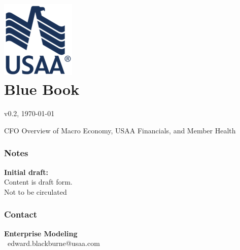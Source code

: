 \documentclass{report}
\begin{document}
\setlength\intextsep{0pt}
\setlength{\columnsep}{8pt}
\setlength{\wrapoverhang}{0pt}


\chapter*{
		\includegraphics{blue_eagle.png}\\\color{usaablue} Blue Book}
\vspace*{-16mm}

\footnotesize %
\color{usaablue}v0.2, \today \normalsize 

\vspace{11mm}

\normalsize \color{usaablue}CFO Overview of Macro Economy, USAA Financials, and Member Health

\vspace{16mm}

\thispagestyle{empty}

\begin{minipage}{0.36\textwidth}
\subsection*{ {\color{red} \faExclamationTriangle} \seriffont Notes}

{\color{red} \textbf{Initial draft:}} \\
Content is draft form. \\ Not to be circulated 
\vfill

\end{minipage}
\begin{minipage}{0.36\textwidth}
\subsection*{{\color{gray} \faUser} Contact}

\textbf{Enterprise Modeling} \  \\
{\color{gray} \faEnvelope} \ edward.blackburne@usaa.com \ \\

\end{minipage}
\end{document}
